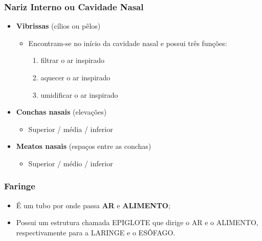 \documentclass[
]{book}
\providecommand{\tightlist}{%
  \setlength{\itemsep}{0pt}\setlength{\parskip}{0pt}}
\begin{document}
\hypertarget{nariz-interno-ou-cavidade-nasal}{%
\subsubsection{Nariz Interno ou Cavidade Nasal}\label{nariz-interno-ou-cavidade-nasal}}

\begin{itemize}
\tightlist
\item
  \textbf{Vibrissas} (cílios ou pêlos)

  \begin{itemize}
  \tightlist
  \item
    Encontram-se no início da cavidade nasal e possui três funções:

    \begin{enumerate}
    \def\labelenumi{\arabic{enumi}.}
    \tightlist
    \item
      filtrar o ar inspirado
    \item
      aquecer o ar inspirado
    \item
      umidificar o ar inspirado
    \end{enumerate}
  \end{itemize}
\item
  \textbf{Conchas nasais }(elevações)

  \begin{itemize}
  \tightlist
  \item
    Superior / média / inferior
  \end{itemize}
\item
  \textbf{Meatos nasais} (espaços entre as conchas)

  \begin{itemize}
  \tightlist
  \item
    Superior / médio / inferior
  \end{itemize}
\end{itemize}

\hypertarget{faringe}{%
\subsubsection{Faringe}\label{faringe}}

\begin{itemize}
\tightlist
\item
  É um tubo por onde passa \textbf{AR} e \textbf{ALIMENTO};
\item
  Possui um estrutura chamada EPIGLOTE que dirige o AR e o ALIMENTO, respectivamente para a LARINGE e o ESÔFAGO.
\end{itemize}
\end{document}
